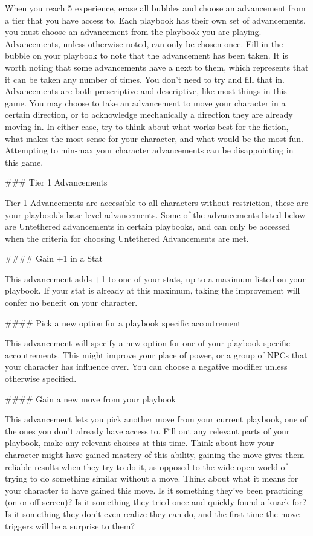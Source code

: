 \documentclass[
  oneside,
  statementpaper,
  9pt]{memoir}
\begin{document}
\begin{Player}
When you reach 5 experience, erase all bubbles and choose an advancement from a tier that you have access to. Each playbook has their own set of advancements, you must choose an advancement from the playbook you are playing. Advancements, unless otherwise noted, can only be chosen once. Fill in the bubble on your playbook to note that the advancement has been taken. It is worth noting that some advancements have a \* next to them, which represents that it can be taken any number of times. You don't need to try and fill that in. Advancements are both prescriptive and descriptive, like most things in this game. You may choose to take an advancement to move your character in a certain direction, or to acknowledge mechanically a direction they are already moving in. In either case, try to think about what works best for the fiction, what makes the most sense for your character, and what would be the most fun. Attempting to min-max your character advancements can be disappointing in this game.

### Tier 1 Advancements

Tier 1 Advancements are accessible to all characters without restriction, these are your playbook’s base level advancements. Some of the advancements listed below are Untethered advancements in certain playbooks, and can only be accessed when the criteria for choosing Untethered Advancements are met.

#### Gain +1 in a Stat

This advancement adds +1 to one of your stats, up to a maximum listed on your playbook. If your stat is already at this maximum, taking the improvement will confer no benefit on your character.

#### Pick a new option for a playbook specific accoutrement

This advancement will specify a new option for one of your playbook specific accoutrements. This might improve your place of power, or a group of NPCs that your character has influence over. You can choose a negative modifier unless otherwise specified.

#### Gain a new move from your playbook

This advancement lets you pick another move from your current playbook, one of the ones you don’t already have access to. Fill out any relevant parts of your playbook, make any relevant choices at this time. Think about how your character might have gained mastery of this ability, gaining the move gives them reliable results when they try to do it, as opposed to the wide-open world of trying to do something similar without a move. Think about what it means for your character to have gained this move. Is it something they’ve been practicing (on or off screen)? Is it something they tried once and quickly found a knack for? Is it something they don’t even realize they can do, and the first time the move triggers will be a surprise to them?


\end{Player}
\end{document}
